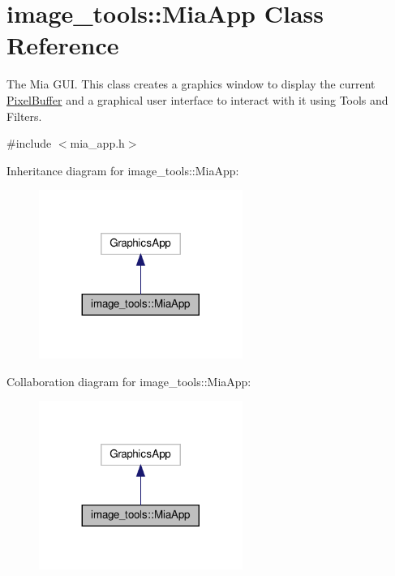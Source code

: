 \hypertarget{classimage__tools_1_1MiaApp}{}\section{image\+\_\+tools\+:\+:Mia\+App Class Reference}
\label{classimage__tools_1_1MiaApp}


The Mia G\+UI. This class creates a graphics window to display the current \hyperlink{classimage__tools_1_1PixelBuffer}{Pixel\+Buffer} and a graphical user interface to interact with it using Tools and Filters.  




{\ttfamily \#include $<$mia\+\_\+app.\+h$>$}



Inheritance diagram for image\+\_\+tools\+:\+:Mia\+App\+:
\nopagebreak
\begin{figure}[H]
\begin{center}
\leavevmode
\includegraphics[width=188pt]{classimage__tools_1_1MiaApp__inherit__graph}
\end{center}
\end{figure}


Collaboration diagram for image\+\_\+tools\+:\+:Mia\+App\+:
\nopagebreak
\begin{figure}[H]
\begin{center}
\leavevmode
\includegraphics[width=188pt]{classimage__tools_1_1MiaApp__coll__graph}
\end{center}
\end{figure}
